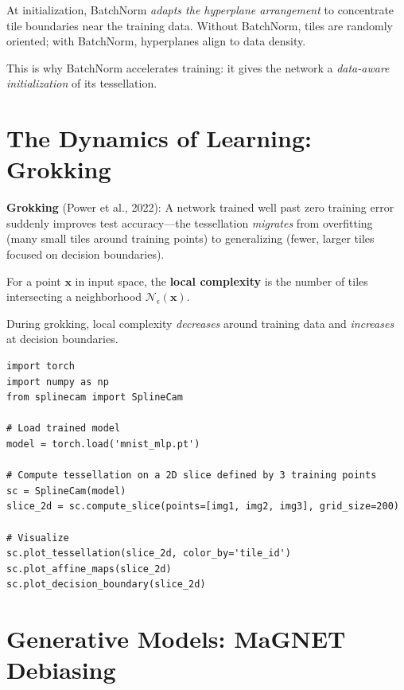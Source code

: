 \begin{theorem}
At initialization, BatchNorm \emph{adapts the hyperplane arrangement} to concentrate tile boundaries near the training data. Without BatchNorm, tiles are randomly oriented; with BatchNorm, hyperplanes align to data density.
\end{theorem}

This is why BatchNorm accelerates training: it gives the network a \emph{data-aware initialization} of its tessellation.

\section{The Dynamics of Learning: Grokking}
\label{sec:dl:grokking}

\textbf{Grokking} (Power et al., 2022): A network trained well past zero training error suddenly improves test accuracy---the tessellation \emph{migrates} from overfitting (many small tiles around training points) to generalizing (fewer, larger tiles focused on decision boundaries).

\begin{definition}
For a point $\bm{x}$ in input space, the \textbf{local complexity} is the number of tiles intersecting a neighborhood $\mathcal{N}_\epsilon(\bm{x})$.
\end{definition}

During grokking, local complexity \emph{decreases} around training data and \emph{increases} at decision boundaries.

\begin{lstlisting}[style=python,caption=SplineCam: Visualizing network tessellation]
import torch
import numpy as np
from splinecam import SplineCam

# Load trained model
model = torch.load('mnist_mlp.pt')

# Compute tessellation on a 2D slice defined by 3 training points
sc = SplineCam(model)
slice_2d = sc.compute_slice(points=[img1, img2, img3], grid_size=200)

# Visualize
sc.plot_tessellation(slice_2d, color_by='tile_id')
sc.plot_affine_maps(slice_2d)
sc.plot_decision_boundary(slice_2d)
\end{lstlisting}

\section{Generative Models: MaGNET Debiasing}
\label{sec:dl:magnet}

